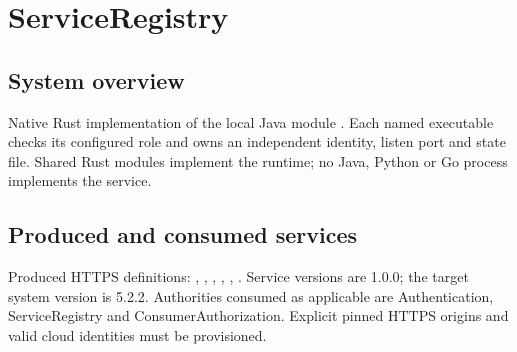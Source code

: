 \documentclass[a4paper]{arrowhead}
\begin{document}
\ArrowheadSetup
{}
\begin{center}\vspace*{8mm}{\LARGE Arrowhead core systems in Rust}\par\vspace{4mm}{\large Native implementation and interface catalogue}\end{center}
\begin{abstract}Five active core modules in the local Java 5.2.2 reference are implemented as independently running native Rust systems. This catalogue records the delivered design, services, trust boundaries, interfaces and remaining work. It does not certify full Java interchangeability or a modified cloud deployment.\end{abstract}
\clearpage\setcounter{tocdepth}{1}\tableofcontents\clearpage
\section{ServiceRegistry}
\subsection{System overview}
Native Rust implementation of the local Java module . Each named executable checks its configured role and owns an independent identity, listen port and state file. Shared Rust modules implement the runtime; no Java, Python or Go process implements the service.
\subsection{Produced and consumed services}
Produced HTTPS definitions: , \allowbreak {}, \allowbreak {}, \allowbreak {}, \allowbreak {}, \allowbreak {}. Service versions are 1.0.0; the target system version is 5.2.2. Authorities consumed as applicable are Authentication, ServiceRegistry and ConsumerAuthorization. Explicit pinned HTTPS origins and valid cloud identities must be provisioned.
\end{document}
